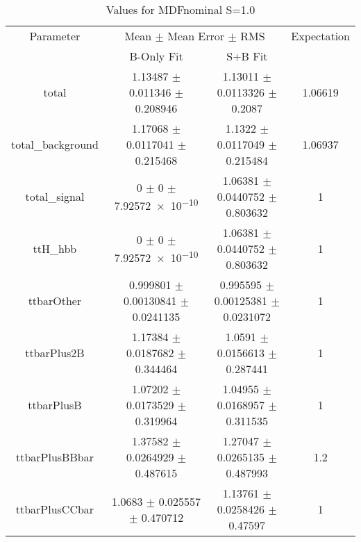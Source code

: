 \begin{table}
\centering
\caption{Values for MDFnominal S=1.0}
\begin{tabular}{cccc}
\toprule
Parameter & \multicolumn{2}{c}{Mean $\pm$ Mean Error $\pm$ RMS} & Expectation\\
 & B-Only Fit & S+B Fit & \\
\midrule
total & \num{1.13487} $\pm$ \num{0.011346} $\pm$ \num{0.208946} & \num{1.13011} $\pm$ \num{0.0113326} $\pm$ \num{0.2087} & \num{1.06619}\\
total\_background & \num{1.17068} $\pm$ \num{0.0117041} $\pm$ \num{0.215468} & \num{1.1322} $\pm$ \num{0.0117049} $\pm$ \num{0.215484} & \num{1.06937}\\
total\_signal & \num{0} $\pm$ \num{0} $\pm$ \num{7.92572e-10} & \num{1.06381} $\pm$ \num{0.0440752} $\pm$ \num{0.803632} & \num{1}\\
ttH\_hbb & \num{0} $\pm$ \num{0} $\pm$ \num{7.92572e-10} & \num{1.06381} $\pm$ \num{0.0440752} $\pm$ \num{0.803632} & \num{1}\\
ttbarOther & \num{0.999801} $\pm$ \num{0.00130841} $\pm$ \num{0.0241135} & \num{0.995595} $\pm$ \num{0.00125381} $\pm$ \num{0.0231072} & \num{1}\\
ttbarPlus2B & \num{1.17384} $\pm$ \num{0.0187682} $\pm$ \num{0.344464} & \num{1.0591} $\pm$ \num{0.0156613} $\pm$ \num{0.287441} & \num{1}\\
ttbarPlusB & \num{1.07202} $\pm$ \num{0.0173529} $\pm$ \num{0.319964} & \num{1.04955} $\pm$ \num{0.0168957} $\pm$ \num{0.311535} & \num{1}\\
ttbarPlusBBbar & \num{1.37582} $\pm$ \num{0.0264929} $\pm$ \num{0.487615} & \num{1.27047} $\pm$ \num{0.0265135} $\pm$ \num{0.487993} & \num{1.2}\\
ttbarPlusCCbar & \num{1.0683} $\pm$ \num{0.025557} $\pm$ \num{0.470712} & \num{1.13761} $\pm$ \num{0.0258426} $\pm$ \num{0.47597} & \num{1}\\
\bottomrule
\end{tabular}
\end{table}